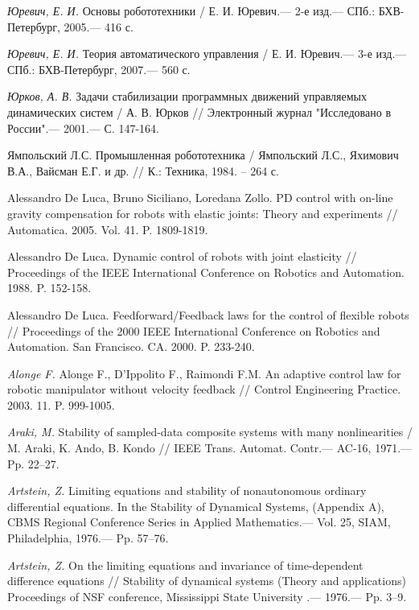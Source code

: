 \begin{thebibliography}{10}
	{\it Юревич, Е. И.} Основы робототехники / Е. И. Юревич.— 2-е изд.— СПб.:
	БХВ-Петербург, 2005.— 416 с.
	
	{\it Юревич, Е. И.} Теория автоматического управления / Е. И. Юревич.— 3-е изд.— СПб.:
	БХВ-Петербург, 2007.— 560 с.
	
	{\it Юрков, А. В.} Задачи стабилизации программных движений управляемых динамических систем / А. В. Юрков // Электронный журнал "Исследовано в России".— 2001.— С. 147-164.
		
	Ямпольский Л.С. Промышленная робототехника / Ямпольский Л.С., Яхимович В.А., Вайсман Е.Г. и др. // К.: Техника, 1984. – 264 с.
	
	 Alessandro De Luca, Bruno Siciliano, Loredana Zollo. PD control with on-line gravity
	compensation for robots with elastic joints: Theory and experiments // Automatica. 2005. Vol. 41. P.
	1809-1819.
	
	 Alessandro De Luca. Dynamic control of robots with joint elasticity // Proceedings of the IEEE
	International Conference on Robotics and Automation. 1988. P. 152-158.
	
	 Alessandro De Luca. Feedforward/Feedback laws for the control of flexible robots //
	Proceedings of the 2000 IEEE International Conference on Robotics and Automation. San Francisco. CA.
	2000. P. 233-240.
	
	{\it Alonge F.} Alonge F., D’Ippolito F., Raimondi F.M. An adaptive control law for robotic manipulator without velocity feedback // Control Engineering Practice. 2003. 11. P. 999-1005.
	
	{\it Araki, M.} Stability of sampled-data composite systems with many nonlinearities / M. Araki, K. Ando, B. Kondo // IEEE Trans. Automat. Contr.— AC-16, 1971.— Pp. 22–27.
	
	{\it Artstein, Z.} Limiting equations and stability of nonautonomous ordinary differential equations. In the Stability of Dynamical Systems, (Appendix A), CBMS Regional Conference Series in Applied Mathematics.— Vol. 25, SIAM, Philadelphia, 1976.— Pp. 57–76.
	
	{\it Artstein, Z.} On the limiting equations and invariance of time-dependent difference equations // Stability of dynamical systems (Theory and applications) Proceedings of NSF conference, Mississippi State University .— 1976.— Pp. 3–9.
	

\end{thebibliography}
